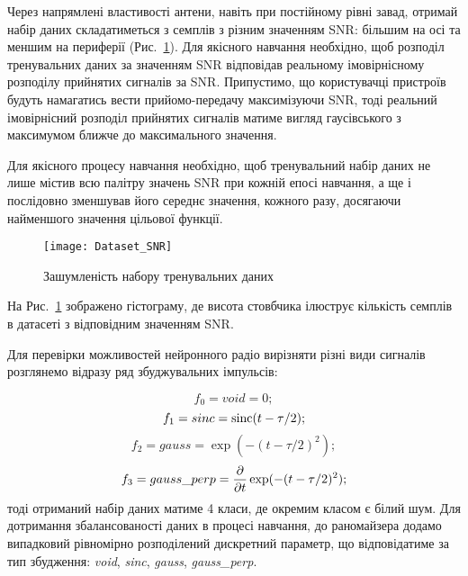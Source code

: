 Через напрямлені властивості антени, навіть при постійному рівні завад, отримай 
набір даних складатиметься з семплів з різним значенням SNR: більшим на осі та
меншим на периферії (Рис.~\ref{fig:SNR}). Для якісного навчання необхідно, 
щоб розподіл тренувальних даних за значенням SNR відповідав реальному 
імовірнісному розподілу прийнятих сигналів за SNR. Припустимо, що користувачці 
пристроїв будуть намагатись вести прийомо-передачу максимізуючи SNR, тоді
реальний імовірнісний розподіл прийнятих сигналів матиме вигляд гаусівського 
з максимумом ближче до максимального значення.

Для якісного процесу навчання необхідно, щоб тренувальний набір даних не 
лише містив всю палітру значень SNR при кожній епосі навчання, а ще і 
послідовно зменшував його середнє значення, кожного разу, досягаючи 
найменшого значення цільової функції.

\begin{figure}[htbp] \begin{center}
\texttt{[image: Dataset\_SNR]}
\caption{Зашумленість набору тренувальних даних} \label{fig:SNR}
\end{center} \end{figure}

На Рис.~\ref{fig:SNR} зображено гістограму, де висота стовбчика ілюструє 
кількість семплів в датасеті з відповідним значенням SNR.

Для перевірки можливостей нейронного радіо вирізняти різні види сигналів 
розглянемо відразу ряд збуджувальних імпульсів:

\begin{equation} \label{eq:type_void}
f_0 = void = 0;
\end{equation}
%
\begin{equation} \label{eq:type_sinc}
f_1 = sinc = \operatorname{sinc}(t-\tau/2);
\end{equation}
%
\begin{equation} \label{eq:type_gauss}
f_2 = gauss = \exp(- (t-\tau/2)^2 );
\end{equation}
%
\begin{equation} \label{eq:type_gauss_perp}
f_3 = gauss\_perp = \frac{\partial }{\partial t} \exp(- (t-\tau/2)^2 );
\end{equation}
%
тоді отриманий набір даних матиме 4 класи, де окремим класом є білий шум. Для
дотримання збалансованості даних в процесі навчання, до раномайзера додамо 
випадковий рівномірно розподілений дискретний параметр, що відповідатиме 
за тип збудження: \textit{void}, \textit{sinc}, \textit{gauss}, 
\textit{gauss\_perp}.

